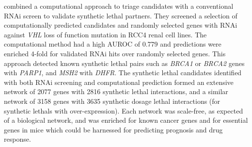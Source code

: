 \citet{Jerby2014} combined a computational approach to triage candidates with a conventional \gls{RNAi} screen to validate \gls{synthetic lethal} partners. They screened a selection of computationally predicted candidates and randomly selected genes with \gls{RNAi} against \textit{VHL} loss of function \gls{mutation} in RCC4 renal cell lines. The computational method had a high \gls{AUROC} of 0.779 and predictions were enriched 4-fold for validated \gls{RNAi} hits over randomly selected genes. This approach detected known \gls{synthetic lethal} pairs such as \textit{BRCA1} or \textit{BRCA2} genes with \textit{PARP1}, and \textit{MSH2} with \textit{DHFR}. The \gls{synthetic lethal} candidates identified with both \gls{RNAi} screening and computational prediction formed an extensive network of 2077 genes with 2816 \gls{synthetic lethal} interactions, and a similar network of 3158 genes with 3635 \gls{synthetic dosage lethal} interactions (for \glspl{synthetic lethal} with over-expression). Each network was \gls{scale-free}, as expected of a biological network, and was enriched for known \glspl{cancer gene} and for \gls{essential} genes in mice which could be harnessed for predicting prognosis and drug response. 

